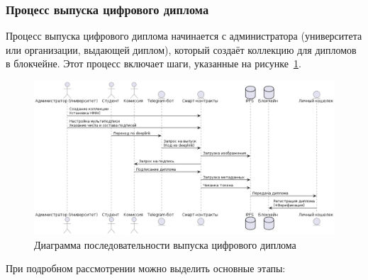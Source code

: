 \subsubsection{Процесс выпуска цифрового диплома}

Процесс выпуска цифрового диплома начинается с администратора (университета или организации, выдающей диплом), который создаёт коллекцию для дипломов в блокчейне. Этот процесс включает шаги, указанные на рисунке~\ref{fig:diploma_issue}.

\begin{figure}[H]
	\centering
	\includegraphics[width=\textwidth]{images/2.diploma_issue.png}
	\parskip=6pt
	\caption{Диаграмма последовательности выпуска цифрового диплома}
	\label{fig:diploma_issue}
\end{figure}

При подробном рассмотрении можно выделить основные этапы:

